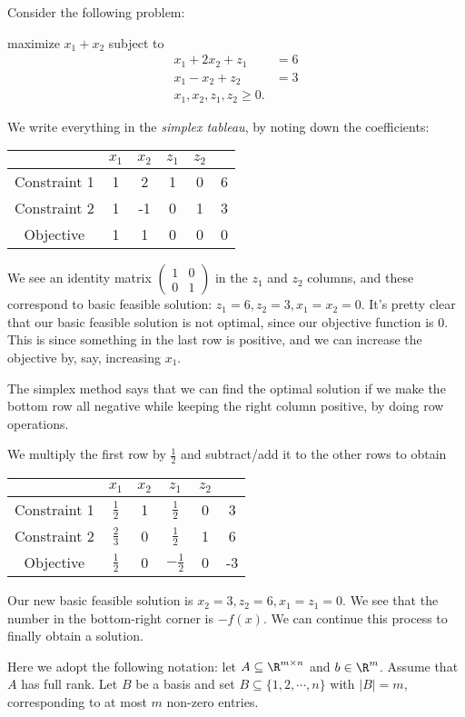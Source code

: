 \documentclass[a4paper]{article}
\begin{document}
\begin{eg}
  Consider the following problem:
  \begin{center}
    maximize $x_1 + x_2$ subject to
    \begin{align*}
      x_1 + 2x_2 + z_1 &= 6\\
      x_1 - x_2 + z_2 &= 3\\
      x_1, x_2, z_1, z_2 \geq 0.
    \end{align*}
  \end{center}
  We write everything in the \emph{simplex tableau}, by noting down the coefficients:
  \begin{center}
    \begin{tabular}{cccccc}
      \toprule
      &$x_1$ & $x_2$ & $z_1$ & $z_2$ \\
      \midrule
      Constraint 1 & 1 & 2 & 1 & 0 & 6 \\
      Constraint 2 & 1 & -1 & 0 & 1 & 3 \\
      Objective & 1 & 1 & 0 & 0 & 0 \\
      \bottomrule
    \end{tabular}
  \end{center}
  We see an identity matrix $\begin{pmatrix} 1 & 0\\ 0 & 1\end{pmatrix}$ in the $z_1$ and $z_2$ columns, and these correspond to basic feasible solution: $z_1 = 6, z_2 = 3, x_1 = x_2 = 0$. It's pretty clear that our basic feasible solution is not optimal, since our objective function is $0$. This is since something in the last row is positive, and we can increase the objective by, say, increasing $x_1$.

  The simplex method says that we can find the optimal solution if we make the bottom row all negative while keeping the right column positive, by doing row operations.

  We multiply the first row by $\frac{1}{2}$ and subtract/add it to the other rows to obtain
  \begin{center}
    \begin{tabular}{cccccc}
      \toprule
      &$x_1$ & $x_2$ & $z_1$ & $z_2$ & \\
      \midrule
      Constraint 1 & $\frac{1}{2}$ & 1 & $\frac{1}{2}$ & 0 & 3 \\
      Constraint 2 & $\frac{2}{3}$ & 0 & $\frac{1}{2}$ & 1 & 6 \\
      Objective & $\frac{1}{2}$ & 0 & $-\frac{1}{2}$ & 0 & -3\\
      \bottomrule
    \end{tabular}
  \end{center}
  Our new basic feasible solution is $x_2 = 3, z_2 = 6, x_1 = z_1 = 0$. We see that the number in the bottom-right corner is $-f(x)$. We can continue this process to finally obtain a solution.
\end{eg}
Here we adopt the following notation: let $A\subseteq \R^{m\times n}$ and $b\in \R^m$. Assume that $A$ has full rank. Let $B$ be a basis and set $B\subseteq \{1, 2, \cdots, n\}$ with $|B| = m$, corresponding to at most $m$ non-zero entries.
\end{document}
